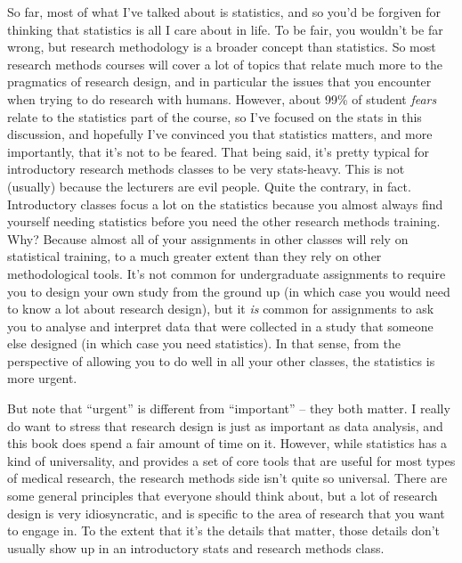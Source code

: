 So far, most of what I've talked about is statistics, and so you'd be forgiven for thinking that statistics is all I care about in life. To be fair, you wouldn't be far wrong, but research methodology is a broader concept than statistics. So most research methods  courses will cover a lot of topics that relate much more to the pragmatics of research design, and in particular the issues that you encounter when trying to do research with humans. However, about 99\% of student {\it fears} relate to the statistics part of the course, so I've focused on the stats in this discussion, and hopefully I've convinced you that statistics matters, and more importantly, that it's not to be feared.  That being said, it's pretty typical for introductory research methods classes to be very stats-heavy. This is not (usually) because the lecturers are evil people. Quite the contrary, in fact. Introductory classes focus a lot on the statistics because you almost always find yourself needing statistics before you need the other research methods training. Why? Because almost all of your assignments in other classes will rely on statistical training, to a much greater extent than they rely on other methodological tools. It's not common for undergraduate  assignments to require you to design your own study from the ground up (in which case you would need to know a lot about research design), but it {\it is} common for assignments to ask you to analyse and interpret data that were collected in a study that someone else designed (in which case you need statistics). In that sense, from the perspective of allowing you to do well in all your other classes, the statistics is more urgent. 

But note that ``urgent'' is different from ``important'' -- they both matter. I really do want to stress that research design is just as important as data analysis, and this book does spend a fair amount of time on it. However, while statistics has a kind of universality, and provides a set of core tools that are useful for most types of medical research, the research methods side isn't quite so universal. There are some general principles that everyone should think about, but a lot of research design is very idiosyncratic, and is specific to the area of research that you want to engage in. To the extent that it's the details that matter, those details don't usually show up in an introductory stats and research methods class.




